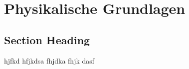 \chapter{Physikalische Grundlagen}
\label{physics} %



\section{Section Heading}

hjfkd hfjkdsa fhjdka fhjk dasf \cite{alhazmi_live_2024}

\printbibliography
